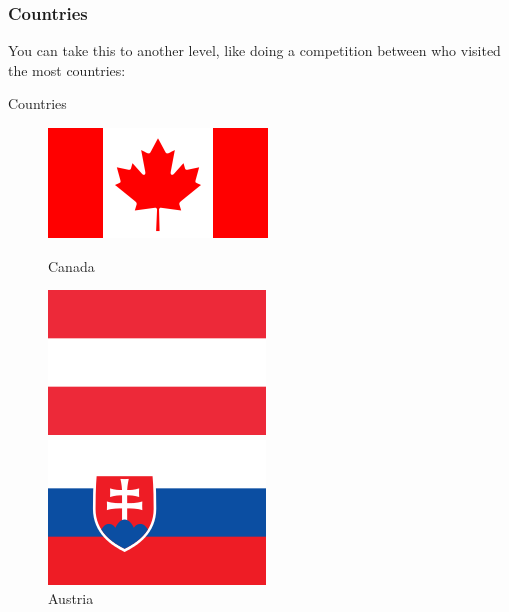 \subsubsection{Countries}

You can take this to another level, like doing a
competition between who visited the most countries:


\begin{frame}{Countries}
\begin{figure}[!ht]
\centering

\begin{minipage}{.24\textwidth}
\centering
\includegraphics[width=1\linewidth]{img/countries/canada.png}
\caption{Canada}
\end{minipage}
\begin{minipage}{.24\textwidth}
\centering
\includegraphics[width=0.8\linewidth]{img/countries/austria.png}
\caption{Austria}
\end{minipage}
\begin{minipage}{.24\textwidth}
\centering
\includegraphics[width=0.8\linewidth]{img/countries/slovakia.png}

\end{minipage}
\end{figure}
\end{frame}
